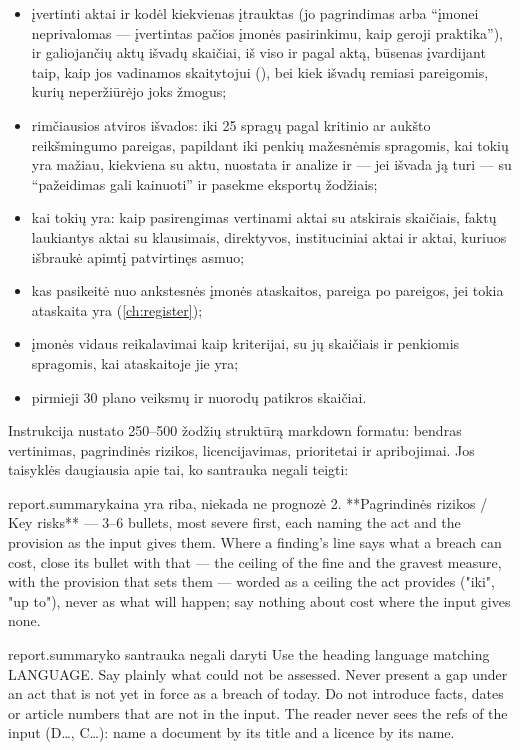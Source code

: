 \begin{itemize}
  \item įvertinti aktai ir kodėl kiekvienas įtrauktas (jo pagrindimas arba \enquote{įmonei
    neprivalomas --- įvertintas pačios įmonės pasirinkimu, kaip geroji praktika}), ir
    galiojančių aktų išvadų skaičiai, iš viso ir pagal aktą, būsenas įvardijant taip, kaip jos
    vadinamos skaitytojui (), bei kiek išvadų remiasi pareigomis, kurių
    neperžiūrėjo joks žmogus;
  \item rimčiausios atviros išvados: iki 25 spragų pagal kritinio ar aukšto reikšmingumo
    pareigas, papildant iki penkių mažesnėmis spragomis, kai tokių yra mažiau, kiekviena su
    aktu, nuostata ir analize ir --- jei išvada ją turi --- su \enquote{pažeidimas gali kainuoti}
    ir pasekme eksportų žodžiais;
  \item kai tokių yra: kaip pasirengimas vertinami aktai su atskirais skaičiais, faktų
    laukiantys aktai su klausimais, direktyvos, instituciniai aktai ir aktai, kuriuos išbraukė
    apimtį patvirtinęs asmuo;
  \item kas pasikeitė nuo ankstesnės įmonės ataskaitos, pareiga po pareigos, jei tokia ataskaita
    yra (\cref{ch:register});
  \item įmonės vidaus reikalavimai kaip kriterijai, su jų skaičiais ir penkiomis spragomis, kai
    ataskaitoje jie yra;
  \item pirmieji 30 plano veiksmų ir nuorodų patikros skaičiai.
\end{itemize}

Instrukcija nustato 250--500 žodžių struktūrą markdown formatu: bendras vertinimas,
pagrindinės rizikos, licencijavimas, prioritetai ir apribojimai. Jos taisyklės daugiausia apie
tai, ko santrauka negali teigti:

\begin{promptexcerpt}{report.summary}{kaina yra riba, niekada ne prognozė}
  2. **Pagrindinės rizikos / Key risks** — 3–6 bullets, most severe first, each naming
     the act and the provision as the input gives them. Where a finding's line says
     what a breach can cost, close its bullet with that — the ceiling of the fine and
     the gravest measure, with the provision that sets them — worded as a ceiling the
     act provides ("iki", "up to"), never as what will happen; say nothing about cost
     where the input gives none.
\end{promptexcerpt}

\begin{promptexcerpt}{report.summary}{ko santrauka negali daryti}
  Use the heading language matching {LANGUAGE}. Say plainly what could not be
  assessed. Never present a gap under an act that is not yet in force as a breach of
  today. Do not introduce facts, dates or article numbers that are not in the input.
  The reader never sees the refs of the input (D…, C…): name a document by its title
  and a licence by its name.
\end{promptexcerpt}

